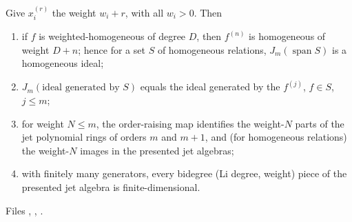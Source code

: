\begin{theorem}\label{l11:thm:jetweights}
Give $x_i^{(r)}$ the weight $w_i+r$, with all $w_i>0$. Then
\begin{enumerate}
\item if $f$ is weighted-homogeneous of degree $D$, then $f^{(n)}$ is homogeneous of weight $D+n$; hence for a set
  $S$ of homogeneous relations, $J_m(\operatorname{span}S)$ is a homogeneous ideal;
\item $J_m(\text{ideal generated by }S)$ equals the ideal generated by the $f^{(j)}$, $f\in S$, $j\le m$;
\item for weight $N\le m$, the order-raising map identifies the weight-$N$ parts of the jet polynomial rings of
  orders $m$ and $m+1$, and (for homogeneous relations) the weight-$N$ images in the presented jet algebras;
\item with finitely many generators, every bidegree (Li degree, weight) piece of the presented jet algebra is
  finite-dimensional.
\end{enumerate}
\end{theorem}
\noindent Files ,
,
.
